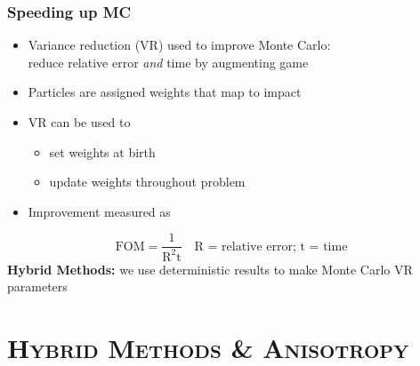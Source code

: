 \documentclass[xcolor=x11names,compress]{beamer}
\renewcommand{\(}{\begin{columns}}
\renewcommand{\)}{\end{columns}}
\newcommand{\<}[1]{\begin{column}{#1}}
\renewcommand{\>}{\end{column}}
\begin{document}
\begin{frame}[fragile]
  \frametitle{Speeding up MC}
  \begin{itemize}
	\item Variance reduction (VR) used to improve Monte Carlo:\\
	reduce relative error \textit{and} time by augmenting game
	\item Particles are assigned weights that map to impact
	\item VR can be used to
	  \begin{itemize}
	  \item set weights at birth
	  \item update weights throughout problem
      \end{itemize}
      \pause
  \item Improvement measured as    
  \end{itemize}
\[
\text{FOM} = \frac{1}{\text{R}^2\text{t}} \quad \text{R = relative error;  t = time} 
\]
\pause
\textbf{Hybrid Methods:} we use deterministic results to make Monte Carlo VR parameters

\end{frame}


\section{\scshape Hybrid Methods \& Anisotropy}
\end{document}
